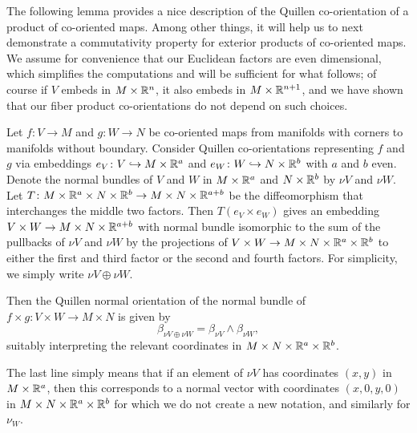 The following lemma provides a nice description of the Quillen co-orientation of a product of co-oriented maps.
Among other things, it will help us to next demonstrate a commutativity property for exterior products of co-oriented maps.
We assume for convenience that our Euclidean factors are even dimensional, which simplifies the computations and will be sufficient for what follows; of course if $V$ embeds in $M \times \mathbb{R}^n$, it also embeds in $M \times \mathbb{R}^{n+1}$, and we have shown that our fiber product co-orientations do not depend on such choices.

\begin{lemma}\label{L: Quillen product co-orientation}
	Let $f \colon V \to M$ and $g \colon W \to N$ be co-oriented maps from manifolds with corners to manifolds without boundary.
	Consider Quillen co-orientations representing $f$ and $g$ via embeddings $e_V \colon V \hookrightarrow M \times \mathbb{R}^a$ and $e_W \colon W \hookrightarrow N \times \mathbb{R}^b$ with $a$ and $b$ even.
	Denote the normal bundles of $V$ and $W$ in $M \times \mathbb{R}^a$ and $N \times \mathbb{R}^b$ by $\nu V$ and $\nu W$.
	Let $T \colon M \times \mathbb{R}^a \times N \times \mathbb{R}^b \to M \times N \times \mathbb{R}^{a+b}$ be the diffeomorphism that interchanges the middle two factors.
	Then
	$T(e_V \times e_W)$ gives an embedding $V \times W \to M \times N \times \mathbb{R}^{a+b}$ with normal bundle isomorphic to the sum of the pullbacks of $\nu V$ and $\nu W$ by the projections of $V \times W \to M \times N \times \mathbb{R}^a \times \mathbb{R}^b$ to either the first and third factor or the second and fourth factors.
	For simplicity, we simply write $\nu V \oplus \nu W$.

	Then the Quillen normal orientation of the normal bundle of $f \times g \colon V \times W \to M \times N$ is given by $$\beta_{\nu V \oplus \nu W} = \beta_{\nu V} \wedge \beta_{\nu W},$$
	suitably interpreting the relevant coordinates in $M \times N \times \mathbb{R}^a \times \mathbb{R}^b$.
\end{lemma}

The last line simply means that if an element of $\nu V$ has coordinates $(x,y)$ in $M \times \mathbb{R}^a$, then this corresponds to a normal vector with coordinates $(x,0,y,0)$ in $M \times N \times \mathbb{R}^a \times \mathbb{R}^b$ for which we do not create a new notation, and similarly for $\nu_W$.

